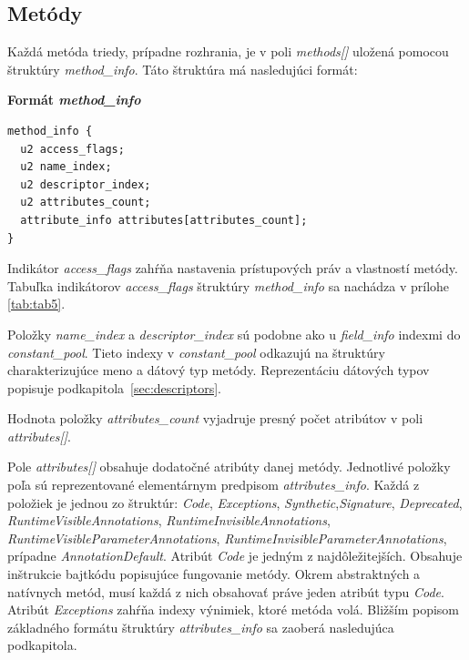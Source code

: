 \documentclass[11pt,final,oneside]{fithesis}
\newenvironment{example}[1]
{
\vspace{3mm}
\noindent\textbf{#1}
\vspace{2mm}
}
{
\vspace{3mm}
}
\begin{document}
\subsection{Metódy}
\label{sec:methods}
Každá metóda triedy, prípadne rozhrania, je v poli \textit{methods[]} uložená
pomocou štruktúry \textit{method\_info}. Táto štruktúra má
nasledujúci formát:

\begin{example}{Formát \textit{method\_info}}
\begin{verbatim}
method_info {
  u2 access_flags;
  u2 name_index;
  u2 descriptor_index;
  u2 attributes_count;
  attribute_info attributes[attributes_count];
}
\end{verbatim}
\end{example}

Indikátor \textit{access\_flags} zahŕňa nastavenia prístupových práv a
vlastností metódy. Tabuľka indikátorov \textit{access\_flags} štruktúry
\textit{method\_info} sa nachádza v prílohe \ref{tab:tab5}.

Položky \textit{name\_index} a \textit{descriptor\_index} sú podobne ako u
\textit{field\_info} indexmi do \textit{constant\_pool}. Tieto indexy
v \textit{constant\_pool} odkazujú na štruktúry charakterizujúce meno a dátový
typ metódy. Reprezentáciu dátových typov popisuje
podkapitola~\ref{sec:descriptors}.

Hodnota položky \textit{attributes\_count} vyjadruje presný počet atribútov
v poli \textit{attributes[]}.

Pole \textit{attributes[]} obsahuje dodatočné atribúty danej metódy.
Jednotlivé položky poľa sú reprezentované elementárnym predpisom
\textit{attributes\_info}. Každá
z položiek je jednou zo štruktúr: \textit{Code}, \textit{Exceptions},
\textit{Synthetic},\textit{Signature}, \textit{Deprecated},
\textit{RuntimeVisibleAnnotations}, \textit{RuntimeInvisibleAnnotations},
\textit{RuntimeVisibleParameterAnnotations},
\textit{RuntimeInvisibleParameterAnnotations},
prípadne \textit{AnnotationDefault}.
Atribút \textit{Code} je jedným z najdôležitejších. Obsahuje inštrukcie
bajtkódu popisujúce fungovanie metódy. Okrem abstraktných a natívnych metód, 
musí každá z nich obsahovať práve jeden atribút typu
\textit{Code}. Atribút \textit{Exceptions} zahŕňa indexy výnimiek, ktoré
metóda volá. Bližším popisom základného formátu štruktúry
\textit{attributes\_info} sa zaoberá nasledujúca podkapitola.
\end{document}

